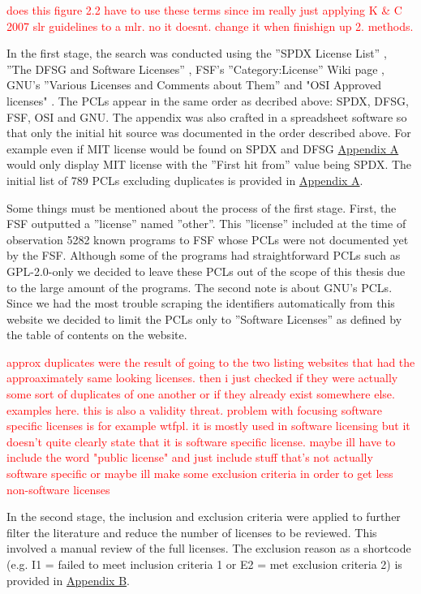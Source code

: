 \textcolor{red}{does this figure 2.2 have to use these terms since im really just applying K \& C 2007 slr guidelines to a mlr. no it doesnt. change it when finishign up 2. methods.}

In the first stage, the search was conducted using the ''SPDX License List'' \citep{spdx:licenses}, ''The DFSG and Software Licenses'' \citep{debian:dfsg}, FSF's ''Category:License'' Wiki page \citep{fsf:licenselist}, GNU's ''Various Licenses and Comments about Them'' \citep{gnu:licenselist} and "OSI Approved licenses" \citep{osi:licenselist}. The PCLs appear in the same order as decribed above: SPDX, DFSG, FSF, OSI and GNU. The appendix was also crafted in a spreadsheet software so that only the initial hit source was documented in the order described above. For example even if MIT license would be found on SPDX and DFSG \hyperref[appendix:a]{Appendix A} would only display MIT license with the ''First hit from'' value being SPDX. The initial list of 789 PCLs excluding duplicates is provided in \hyperref[appendix:a]{Appendix A}. %

Some things must be mentioned about the process of the first stage. First, the FSF outputted a ''license'' named ''other''. This ''license'' included at the time of observation 5282 known programs to FSF whose PCLs were not documented yet by the FSF. Although some of the programs had straightforward PCLs such as GPL-2.0-only we decided to leave these PCLs out of the scope of this thesis due to the large amount of the programs. The second note is about GNU's PCLs. Since we had the most trouble scraping the identifiers automatically from this website we decided to limit the PCLs only to ''Software Licenses'' as defined by the table of contents on the website.

\textcolor{red}{approx duplicates were the result of going to the two listing websites that had the approaximately same looking licenses. then i just checked if they were actually some sort of duplicates of one another or if they already exist somewhere else. examples here. this is also a validity threat. problem with focusing software specific licenses is for example wtfpl. it is mostly used in software licensing but it doesn't quite clearly state that it is software specific license. maybe ill have to include the word "public license" and just include stuff that's not actually software specific or maybe ill make some exclusion criteria in order to get less non-software licenses}

In the second stage, the inclusion and exclusion criteria were applied to further filter the literature and reduce the number of licenses to be reviewed. This involved a manual review of the full licenses. The exclusion reason as a shortcode (e.g. I1 = failed to meet inclusion criteria 1 or E2 = met exclusion criteria 2) is provided in \hyperref[appendix:b]{Appendix B}.

